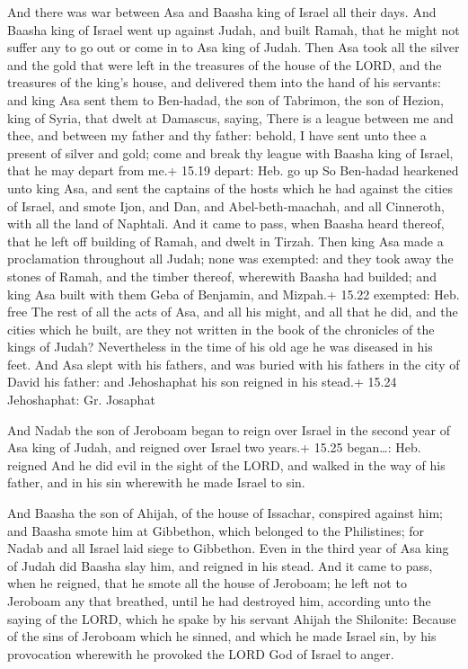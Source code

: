  And there was war between Asa and Baasha king of Israel
all their days.  And Baasha king of Israel went up against
Judah, and built Ramah, that he might not suffer any to go out or come
in to Asa king of Judah.  Then Asa took all the silver and
the gold that were left in the treasures of the house of the LORD, and
the treasures of the king's house, and delivered them into the hand of
his servants: and king Asa sent them to Ben-hadad, the son of Tabrimon,
the son of Hezion, king of Syria, that dwelt at Damascus, saying,
 There is a league between me and thee, and between my
father and thy father: behold, I have sent unto thee a present of silver
and gold; come and break thy league with Baasha king of Israel, that he
may depart from me.+ 15.19 depart: Heb. go up  So Ben-hadad
hearkened unto king Asa, and sent the captains of the hosts which he had
against the cities of Israel, and smote Ijon, and Dan, and
Abel-beth-maachah, and all Cinneroth, with all the land of Naphtali.
 And it came to pass, when Baasha heard thereof, that he
left off building of Ramah, and dwelt in Tirzah.  Then king
Asa made a proclamation throughout all Judah; none was exempted: and
they took away the stones of Ramah, and the timber thereof, wherewith
Baasha had builded; and king Asa built with them Geba of Benjamin, and
Mizpah.+ 15.22 exempted: Heb. free  The rest of all the
acts of Asa, and all his might, and all that he did, and the cities
which he built, are they not written in the book of the chronicles of
the kings of Judah? Nevertheless in the time of his old age he was
diseased in his feet.  And Asa slept with his fathers, and
was buried with his fathers in the city of David his father: and
Jehoshaphat his son reigned in his stead.+ 15.24 Jehoshaphat: Gr.
Josaphat

 And Nadab the son of Jeroboam began to reign over Israel
in the second year of Asa king of Judah, and reigned over Israel two
years.+ 15.25 began\ldots: Heb. reigned  And he did evil in
the sight of the LORD, and walked in the way of his father, and in his
sin wherewith he made Israel to sin.

 And Baasha the son of Ahijah, of the house of Issachar,
conspired against him; and Baasha smote him at Gibbethon, which belonged
to the Philistines; for Nadab and all Israel laid siege to Gibbethon.
 Even in the third year of Asa king of Judah did Baasha
slay him, and reigned in his stead.  And it came to pass,
when he reigned, that he smote all the house of Jeroboam; he left not to
Jeroboam any that breathed, until he had destroyed him, according unto
the saying of the LORD, which he spake by his servant Ahijah the
Shilonite:  Because of the sins of Jeroboam which he
sinned, and which he made Israel sin, by his provocation wherewith he
provoked the LORD God of Israel to anger.

